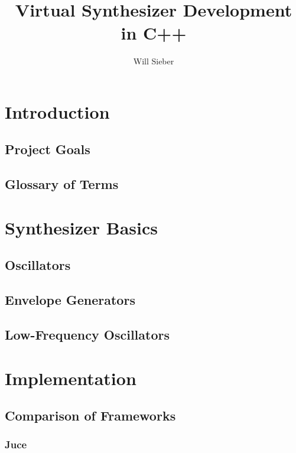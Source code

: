 \documentclass[12pt]{article}
\title{Virtual Synthesizer Development in C++}
\date{\vspace{-5ex}}
\author{Will Sieber}
\begin{document}
\maketitle

\tableofcontents
\newpage


\section{Introduction}

\subsection{Project Goals}

\subsection{Glossary of Terms}

\section{Synthesizer Basics}

\subsection{Oscillators}

\subsection{Envelope Generators}

\subsection{Low-Frequency Oscillators}

\section{Implementation}

\subsection{Comparison of Frameworks}

\subsubsection{Juce}
\end{document}
